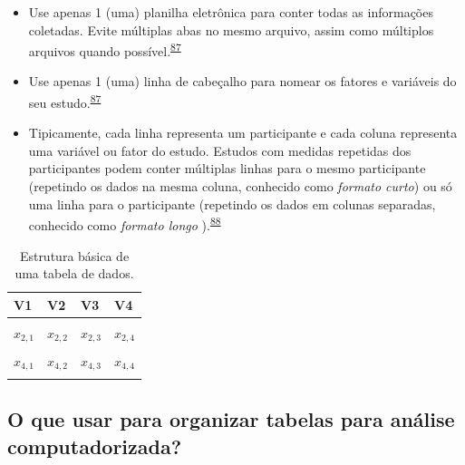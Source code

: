 \documentclass[
  a4paper,
]{book}
\begin{document}
\begin{itemize}
\item
  Use apenas 1 (uma) planilha eletrônica para conter todas as informações coletadas. Evite múltiplas abas no mesmo arquivo, assim como múltiplos arquivos quando possível.\textsuperscript{\protect\hyperlink{ref-broman2018}{87}}
\item
  Use apenas 1 (uma) linha de cabeçalho para nomear os fatores e variáveis do seu estudo.\textsuperscript{\protect\hyperlink{ref-broman2018}{87}}
\item
  Tipicamente, cada linha representa um participante e cada coluna representa uma variável ou fator do estudo. Estudos com medidas repetidas dos participantes podem conter múltiplas linhas para o mesmo participante (repetindo os dados na mesma coluna, conhecido como \emph{formato curto}) ou só uma linha para o participante (repetindo os dados em colunas separadas, conhecido como \emph{formato longo} ).\textsuperscript{\protect\hyperlink{ref-Juluru2015}{88}}
\end{itemize}

\begin{table}

\caption{\label{tab:tabela-0}Estrutura básica de uma tabela de dados.}
\centering
\begin{tabu} to 
\toprule
\textbf{V1} & \textbf{V2} & \textbf{V3} & \textbf{V4}\\
\midrule
{} &  &  & \\
$x_{2,1}$ & $x_{2,2}$ & $x_{2,3}$ & $x_{2,4}$\\
 &  &  & \\
$x_{4,1}$ & $x_{4,2}$ & $x_{4,3}$ & $x_{4,4}$\\
 &  &  & \\
\bottomrule
\end{tabu}
\end{table}

\hypertarget{o-que-usar-para-organizar-tabelas-para-anuxe1lise-computadorizada}{%
\subsection{O que usar para organizar tabelas para análise computadorizada?}\label{o-que-usar-para-organizar-tabelas-para-anuxe1lise-computadorizada}}
\end{document}
